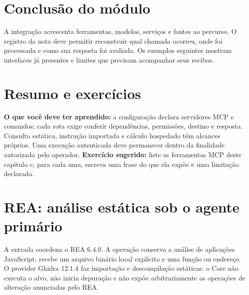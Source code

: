 \section{Conclusão do módulo}

\begin{resultado}
A integração acrescenta ferramentas, modelos, serviços e fontes ao percurso.
O registro da nota deve permitir reconstruir qual chamada ocorreu, onde foi
processada e como sua resposta foi avaliada. Os exemplos seguintes mostram
interfaces já presentes e limites que precisam acompanhar seus recibos.
\end{resultado}


\section{Resumo e exercícios}

\begin{resultado}
\textbf{O que você deve ter aprendido:} a configuração declara
\CoreMCPCount{} servidores MCP e \CoreCommandCount{} comandos; cada rota
exige conferir dependências, permissões, destino e resposta. Consulta estática,
instrução importada e cálculo hospedado têm alcances próprios. Uma execução
autenticada deve permanecer dentro da finalidade autorizada pelo operador.
\textbf{Exercício sugerido:} liste as ferramentas MCP deste capítulo e, para
cada uma, escreva uma frase do que ela expõe e uma limitação declarada.
\end{resultado}



\clearpage
\section{REA: análise estática sob o agente primário}


\begin{descricao}
A entrada  coordena o REA 6.4.0.
A operação  conserva a análise de aplicações JavaScript;
 recebe um arquivo binário local explícito e uma função
ou endereço. O provider Ghidra 12.1.4 faz importação e descompilação estáticas:
o Core não executa o alvo, não inicia depuração e não expõe arbitrariamente
as operações de alteração anunciadas pelo REA.
\end{descricao}

